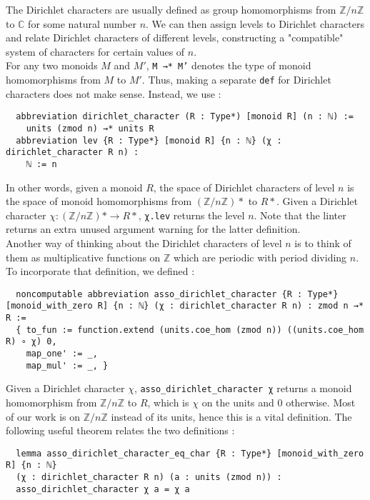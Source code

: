 \documentclass[11pt]{article}
\newcommand{\lean}[1]{\texttt{#1}\xspace} %
\begin{document}
The Dirichlet characters are usually defined as group homomorphisms from $\mathbb{Z}/n \mathbb{Z}$ to $\mathbb{C}$ for some natural number $n$. 
We can then assign levels to Dirichlet characters and relate Dirichlet characters of different levels, constructing a "compatible" system of 
characters for certain values of $n$. \\

For any two monoids $M$ and $M'$, \lean{M →* M'} denotes the type of monoid homomorphisms from $M$ to $M'$. Thus, making a separate 
\lean{def} for Dirichlet characters does not make sense. Instead, we use :
\begin{lstlisting}
  abbreviation dirichlet_character (R : Type*) [monoid R] (n : ℕ) := 
    units (zmod n) →* units R
  abbreviation lev {R : Type*} [monoid R] {n : ℕ} (χ : dirichlet_character R n) : 
    ℕ := n
\end{lstlisting}

In other words, given a monoid $R$, the space of Dirichlet characters of level $n$ is the space of monoid homomorphisms from 
$(\mathbb{Z}/n \mathbb{Z})*$ to $R*$. Given a Dirichlet character $\chi : (\mathbb{Z}/n \mathbb{Z})* \to R*$, \lean{χ.lev} 
returns the level $n$. Note that the linter returns an extra unused argument warning for the latter definition. \\

Another way of thinking about the Dirichlet characters of level $n$ is to think of them as multiplicative functions on $\mathbb{Z}$ 
which are periodic with period dividing $n$. To incorporate that definition, we defined : 
\begin{lstlisting}
  noncomputable abbreviation asso_dirichlet_character {R : Type*} [monoid_with_zero R] {n : ℕ} (χ : dirichlet_character R n) : zmod n →* R :=
  { to_fun := function.extend (units.coe_hom (zmod n)) ((units.coe_hom R) ∘ χ) 0,
    map_one' := _,
    map_mul' := _, }
\end{lstlisting}

Given a Dirichlet character $\chi$, \lean{asso\_dirichlet\_character χ} returns a monoid homomorphism from $\mathbb{Z}/n \mathbb{Z}$ 
to $R$, which is $\chi$ on the units and 0 otherwise. Most of our work is on $\mathbb{Z}/n \mathbb{Z}$ instead of its units, hence this 
is a vital definition. The following useful theorem relates the two definitions :
\begin{lstlisting}
  lemma asso_dirichlet_character_eq_char {R : Type*} [monoid_with_zero R] {n : ℕ}
  (χ : dirichlet_character R n) (a : units (zmod n)) : 
  asso_dirichlet_character χ a = χ a 
\end{lstlisting}
\end{document}
